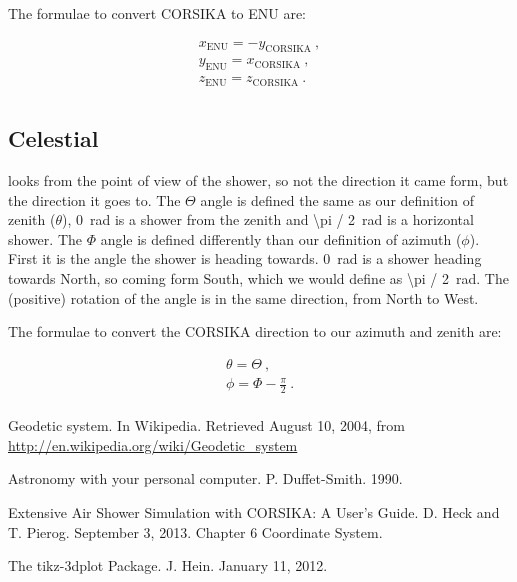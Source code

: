 The formulae to convert CORSIKA to ENU are:

\begin{equation}
    \begin{array}{l}
        x_{\mathrm{ENU}} = -y_{\mathrm{CORSIKA}} \ , \\
        y_{\mathrm{ENU}} = x_{\mathrm{CORSIKA}} \ , \\
        z_{\mathrm{ENU}} = z_{\mathrm{CORSIKA}} \ . \\
    \end{array}
\end{equation}


\subsection{Celestial}

\corsika looks from the point of view of the shower, so not the
direction it came form, but the direction it goes to. The $\Theta$ angle
is defined the same as our definition of zenith ($\theta$),
\SI{0}{\radian} is a shower from the zenith and \SI{\pi / 2}{\radian} is
a horizontal shower. The $\Phi$ angle is defined differently than our
definition of azimuth ($\phi$). First it is the angle the shower is heading
towards. \SI{0}{\radian} is a shower heading towards North, so coming
form South, which we would define as \SI{\pi / 2}{\radian}. The
(positive) rotation of the angle is in the same direction, from North to
West.

The formulae to convert the CORSIKA direction to our azimuth and zenith are:

\begin{equation}
    \begin{array}{l}
        \theta = \Theta \ , \\
        \phi = \Phi - \frac{\pi}{2} \ . \\
    \end{array}
\end{equation}




\begin{thebibliography}{9}

Geodetic system. In Wikipedia. Retrieved August 10, 2004,
from \url{http://en.wikipedia.org/wiki/Geodetic_system}

Astronomy with your personal computer. P. Duffet-Smith.
1990.

Extensive Air Shower Simulation with CORSIKA: A User’s Guide. D. Heck
and T. Pierog. September 3, 2013. Chapter 6 Coordinate System.

The tikz-3dplot Package. J. Hein. January 11, 2012.

\end{thebibliography}
